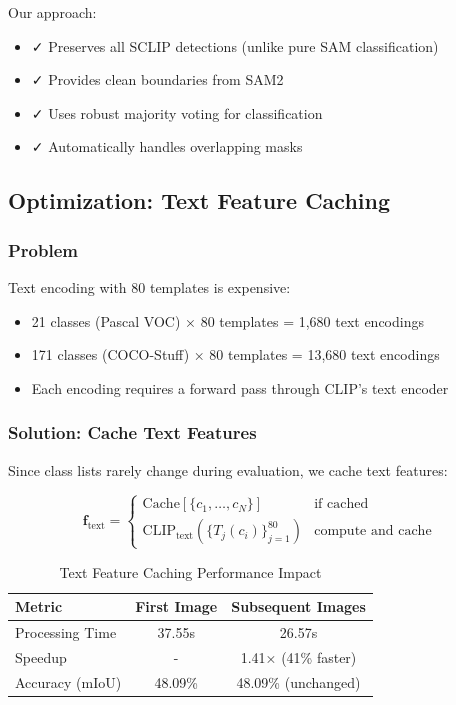 Our approach:
\begin{itemize}
    \item ✓ Preserves all SCLIP detections (unlike pure SAM classification)
    \item ✓ Provides clean boundaries from SAM2
    \item ✓ Uses robust majority voting for classification
    \item ✓ Automatically handles overlapping masks
\end{itemize}

\subsection{Optimization: Text Feature Caching}

\subsubsection{Problem}

Text encoding with 80 templates is expensive:
\begin{itemize}
    \item 21 classes (Pascal VOC) × 80 templates = 1,680 text encodings
    \item 171 classes (COCO-Stuff) × 80 templates = 13,680 text encodings
    \item Each encoding requires a forward pass through CLIP's text encoder
\end{itemize}

\subsubsection{Solution: Cache Text Features}

Since class lists rarely change during evaluation, we cache text features:

\begin{equation}
\mathbf{f}_{\text{text}} =
\begin{cases}
\text{Cache}[\{c_1, \ldots, c_N\}] & \text{if cached} \\
\text{CLIP}_{\text{text}}(\{T_j(c_i)\}_{j=1}^{80}) & \text{compute and cache}
\end{cases}
\end{equation}

\begin{table}[h]
\centering
\caption{Text Feature Caching Performance Impact}
\label{tab:caching}
\begin{tabular}{lcc}
\hline
\textbf{Metric} & \textbf{First Image} & \textbf{Subsequent Images} \\
\hline
Processing Time & 37.55s & 26.57s \\
Speedup & - & 1.41× (41\% faster) \\
Accuracy (mIoU) & 48.09\% & 48.09\% (unchanged) \\
\hline
\end{tabular}
\end{table}

